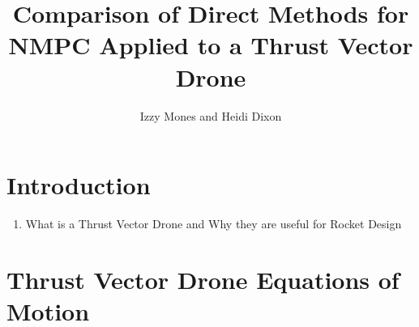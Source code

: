 \documentclass[]{article}
\title{Comparison of Direct Methods for NMPC  Applied to  a Thrust Vector Drone}
\author{Izzy Mones and Heidi Dixon}
\begin{document}
\maketitle
	
\section*{Introduction}	
\begin{enumerate}
	\item What is a Thrust Vector Drone and Why they are useful for Rocket Design
\end{enumerate}
	

	
\section*{Thrust Vector Drone Equations of Motion}
	
\end{document}
